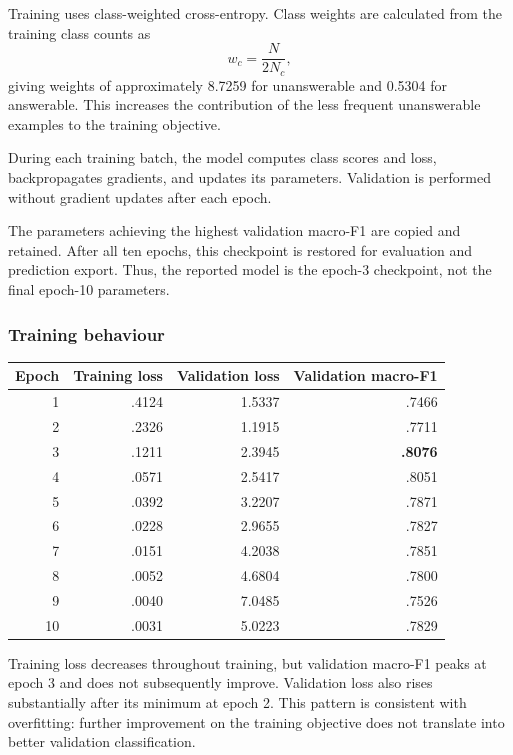 \documentclass[11pt,a4paper]{article}
\begin{document}
Training uses class-weighted cross-entropy. Class weights are calculated
from the training class counts as
\[
w_c = \frac{N}{2N_c},
\]
giving weights of approximately 8.7259 for unanswerable and 0.5304 for
answerable. This increases the contribution of the less frequent
unanswerable examples to the training objective.

During each training batch, the model computes class scores and loss,
backpropagates gradients, and updates its parameters. Validation is
performed without gradient updates after each epoch.

The parameters achieving the highest validation macro-F1 are copied
and retained. After all ten epochs, this checkpoint is restored for
evaluation and prediction export. Thus, the reported model is the
epoch-3 checkpoint, not the final epoch-10 parameters.

\subsubsection{Training behaviour}

\begin{center}
\begin{tabular}{rrrr}
\toprule
Epoch & Training loss & Validation loss & Validation macro-F1 \\
\midrule
1  & .4124 & 1.5337 & .7466 \\
2  & .2326 & 1.1915 & .7711 \\
3  & .1211 & 2.3945 & \textbf{.8076} \\
4  & .0571 & 2.5417 & .8051 \\
5  & .0392 & 3.2207 & .7871 \\
6  & .0228 & 2.9655 & .7827 \\
7  & .0151 & 4.2038 & .7851 \\
8  & .0052 & 4.6804 & .7800 \\
9  & .0040 & 7.0485 & .7526 \\
10 & .0031 & 5.0223 & .7829 \\
\bottomrule
\end{tabular}
\end{center}

Training loss decreases throughout training, but validation macro-F1
peaks at epoch 3 and does not subsequently improve. Validation loss
also rises substantially after its minimum at epoch 2. This pattern
is consistent with overfitting: further improvement on the training
objective does not translate into better validation classification.
\end{document}
